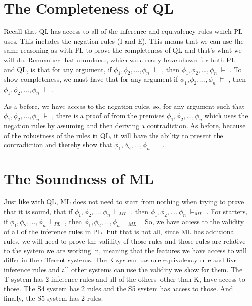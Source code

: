 \section{The Completeness of QL} 
Recall that QL has access to all of the inference and equivalency rules which PL uses. This includes the negation rules (\enot I and \enot E). This means that we can use the same reasoning as with PL to prove the completeness of QL and that's what we will do. Remember that soundness, which we already have shown for both PL and QL, is that for any argument, if  $\phi_1,\phi_2,\ldots,\phi_n$ $\vdash$ , then $\phi_1,\phi_2,\ldots,\phi_n$ $\vDash$ . To show completeness, we must have that for any argument if  $\phi_1,\phi_2,\ldots,\phi_n$ $\vDash$ , then $\phi_1,\phi_2,\ldots,\phi_n$ $\vdash$ . 

As a before, we have access to the negation rules, so, for any argument such that $\phi_1,\phi_2,\ldots,\phi_n$ $\vDash$ , there is a proof of  from the premises $\phi_1,\phi_2,\ldots,\phi_n$ which uses the negation rules by assuming \enot{} and then deriving a contradiction. As before, because of the robustness of the rules in QL, it will have the ability to present the contradiction and thereby show that $\phi_1,\phi_2,\ldots,\phi_n$ $\vdash$ .

\section{The Soundness of ML}
Just like with QL, ML does not need to start from nothing when trying to prove that it is sound, that if $\phi_1,\phi_2,\ldots,\phi_n$ $\vdash_{ML}$ , then $\phi_1,\phi_2,\ldots,\phi_n$ $\vDash_{ML}$ . For starters, if $\phi_1,\phi_2,\ldots,\phi_n$ $\vdash_{PL}$ , then $\phi_1,\phi_2,\ldots,\phi_n$ $\vdash_{ML}$ . So, we have access to the validity of all of the inference rules in PL.  But that is not all, since ML has additional rules, we will need to prove the validity of those rules and those rules are relative to the system we are working in, meaning that the features we have access to will differ in the different systems. The K system has one equivalency rule and five inference rules and all other systems can use the validity we show for them.  The T system has 2 inference rules and all of the others, other than K, have access to those. The S4 system has 2 rules and the S5 system has access to those. And finally, the S5 system has 2 rules.

